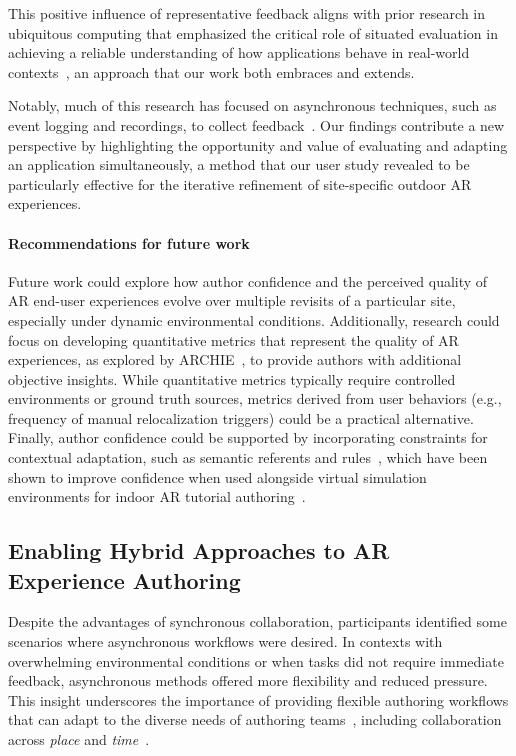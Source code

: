 This positive influence of representative \insitu feedback aligns with prior research in ubiquitous computing that emphasized the critical role of situated evaluation in achieving a reliable understanding of how applications behave in real-world contexts~\cite{rogersWhyItsWorth2007,crabtreeIntroductionSpecialIssue2013}, an approach that our work both embraces and extends.

Notably, much of this research has focused on asynchronous techniques, such as event logging and recordings, to collect \insitu feedback~\cite{rogersWhyItsWorth2007,nogueiraEffectivenessEmbodiedEvaluation2023}. Our findings contribute a new perspective by highlighting the opportunity and value of evaluating and adapting an application simultaneously, a method that our user study revealed to be particularly effective for the iterative refinement of site-specific outdoor AR experiences.

\paragraph{\textbf{Recommendations for future work}}
Future work could explore how author confidence and the perceived quality of AR end-user experiences evolve over multiple revisits of a particular site, especially under dynamic environmental conditions. Additionally, research could focus on developing quantitative metrics that represent the quality of AR experiences, as explored by ARCHIE~\cite{lehmanARCHIEUserFocusedFramework2020}, to provide authors with additional objective insights. While quantitative metrics typically require controlled environments or ground truth sources, metrics derived from user behaviors (e.g., frequency of manual relocalization triggers) could be a practical alternative. Finally, author confidence could be supported by incorporating constraints for contextual adaptation, such as semantic referents and rules~\cite{qianScalARAuthoringSemantically2022,unityMars}, which have been shown to improve confidence when used alongside virtual simulation environments for indoor AR tutorial authoring~\cite{qianScalARAuthoringSemantically2022}.

\subsection{Enabling Hybrid Approaches to AR Experience Authoring}
Despite the advantages of synchronous collaboration, participants identified some scenarios where asynchronous workflows were desired. In contexts with overwhelming environmental conditions or when tasks did not require immediate feedback, asynchronous methods offered more flexibility and reduced pressure. This insight underscores the importance of providing flexible authoring workflows that can adapt to the diverse needs of authoring teams~\cite{kraussCurrentPracticesChallenges2021}, including collaboration across \textit{place} and \textit{time}~\cite{johansenGroupWareComputerSupport1988}.


